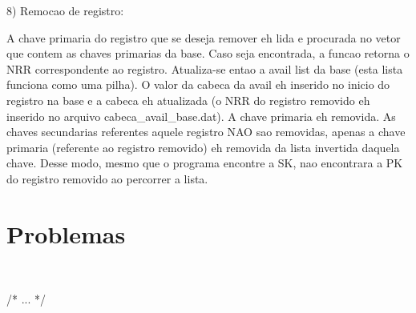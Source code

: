 \documentclass{article}
\begin{document}
8) Remocao de registro:

A chave primaria do registro que se deseja remover eh lida e procurada no vetor que contem as chaves primarias da base. Caso seja encontrada, a funcao retorna o NRR correspondente ao registro.
Atualiza-se entao a avail list da base (esta lista funciona como uma pilha).
O valor da cabeca da avail eh inserido no inicio do registro na base e a cabeca eh atualizada (o NRR do registro removido eh inserido no arquivo cabeca_avail_base.dat).
A chave primaria eh removida.
As chaves secundarias referentes aquele registro NAO sao removidas, apenas a chave primaria (referente ao registro removido) eh removida da lista invertida daquela chave. Desse modo, mesmo que o programa encontre a SK, nao encontrara a PK do registro removido ao percorrer a lista.



\section{Problemas}\

/* ... */
\end{document}

